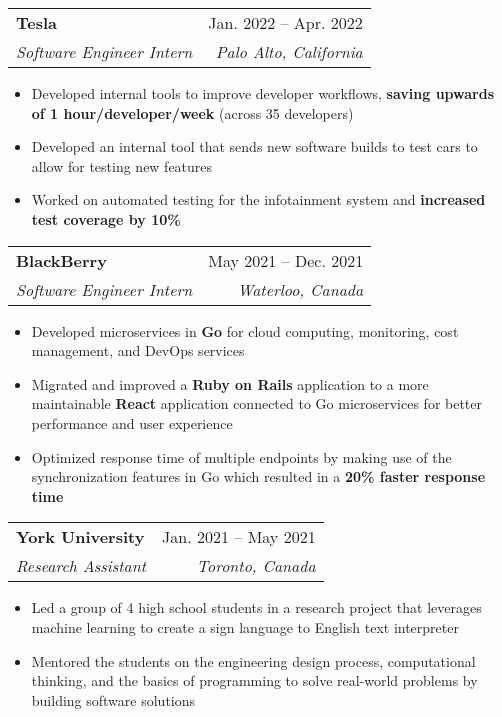 \documentclass[letterpaper,11pt]{article}
\makeatletter
\newcommand{\resumeItem}[1]{
  \item\small{
    {#1 \vspace{1.1pt}}
  }
}
\newcommand{\resumeSubheading}[4]{
  \vspace{-2pt}\item
    \begin{tabular*}{0.97\textwidth}[t]{l@{\extracolsep{\fill}}r}
      \textbf{#1} & #2 \\
      \textit{\small#3} & \textit{\small #4} \\
    \end{tabular*}\vspace{-7pt}
}
\newcommand{\resumeSubSubheading}[2]{
    \item
    \begin{tabular*}{0.97\textwidth}{l@{\extracolsep{\fill}}r}
      \textit{\small#1} & \textit{\small #2} \\
    \end{tabular*}\vspace{-7pt}
}
\newcommand{\resumeSubHeadingListEnd}{\end{itemize}}
\newcommand{\resumeItemListStart}{\begin{itemize}}
\newcommand{\resumeItemListEnd}{\end{itemize}\vspace{-1pt}}
\makeatother
\begin{document}
    \resumeSubheading
      {Tesla}{Jan. 2022 -- Apr. 2022}
      {Software Engineer Intern}{Palo Alto, California}
      \resumeItemListStart
        \resumeItem{Developed internal tools to improve developer workflows, \textbf{saving upwards of 1 hour/developer/week} (across 35 developers)}
        \resumeItem{Developed an internal tool that sends new software builds to test cars to allow for testing new features}
        \resumeItem{Worked on automated testing for the infotainment system and \textbf{increased test coverage by 10\%}}

        \resumeItemListEnd

    \resumeSubheading
      {BlackBerry}{May 2021 -- Dec. 2021}
      {Software Engineer Intern}{Waterloo, Canada}
    
      \resumeItemListStart
        \resumeItem{Developed microservices in \textbf{Go} for cloud computing, monitoring, cost management, and DevOps services}
        \resumeItem{Migrated and improved a \textbf{Ruby on Rails} application to a more maintainable \textbf{React} application connected to Go microservices for better performance and user experience}
        \resumeItem{Optimized response time of multiple endpoints by making use of the synchronization features in Go which resulted in a \textbf{20\% faster response time}}
      \resumeItemListEnd

    \resumeSubheading
      {York University}{Jan. 2021 -- May 2021}
      {Research Assistant}{Toronto, Canada}
    
      \resumeItemListStart
        \resumeItem{Led a group of 4 high school students in a research project that leverages machine learning to create a sign language to English text interpreter}
        \resumeItem{Mentored the students on the engineering design process, computational thinking, and the basics of programming to solve real-world problems by building software solutions}

      \resumeItemListEnd
      
\end{document}
